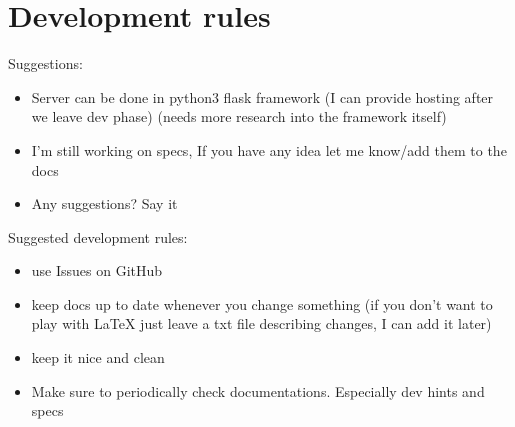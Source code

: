 \chapter{Development rules}
Suggestions:
\begin{itemize}
  \item Server can be done in python3 flask framework (I can provide hosting after we leave dev phase) (needs more research into the framework itself)
  \item  I'm still working on specs, If you have any idea let me know/add them to the docs
  \item Any suggestions? Say it
\end{itemize}
    
Suggested development rules:
\begin{itemize}
  \item use Issues on GitHub
  \item keep docs up to date whenever you change something (if you don't want to play with LaTeX just leave a txt file describing changes, I can add it later)
  \item keep it nice and clean
  \item Make sure to periodically check documentations. Especially dev hints and specs
\end{itemize}

